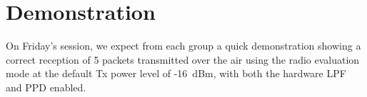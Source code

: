 \section{Demonstration}


On Friday's session, we expect from each group a quick demonstration showing a correct reception of 5 packets transmitted over the air using the radio evaluation mode
at the default Tx power level of -16~dBm, with both the hardware LPF and PPD enabled.

\begin{comment}
\subsection{Report}

Please upload a report of \textbf{maximum} 2 pages with
\begin{enumerate}
    \item The output of the python testbench of the preamble detector (\texttt{3\_compare.py}), as well as your implementation of the Absolute-value norm.

    \item A summary of the resource usage (logic elements) and worst slack (setup) for the different compilation performed :
    \begin{enumerate}
        \item Initial design without register retiming and embedded multipliers.
        \item Initial design with register retiming and embedded multipliers.
        \item Final design with Absolute-value norm estimator.
    \end{enumerate}

    \item A breakdown of the resource usage for the final design including the Absolute-value norm. Focus mainly on logic cells/elements, for both the overall design (\texttt{lms7\_trx\_top}) and for the LimeSuite digital signal processing (\texttt{lms\_dsp)}. You can present it as a pie chart or an histogram. In both case, try to highlight the FIR (low-pass filter) and the preamble detector. You can find the required informations either in the \textit{Hierarchy} tab of the \textit{Project Navigator} view, or in the \textit{Analysis and Synthesis/Resource Utilization by Entity} tab of the compilation report.
\end{enumerate}
\end{comment}